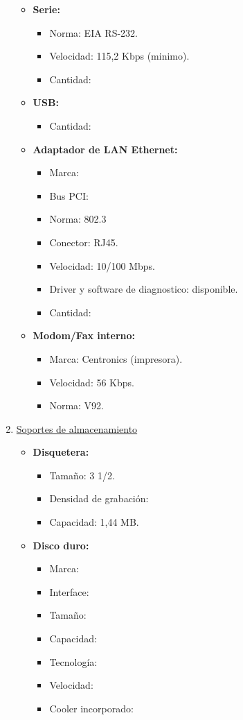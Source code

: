 \begin{enumerate}
\begin{itemize}
    \item \textbf{Serie:}
    \begin{itemize}
      \item Norma: EIA RS-232.
      \item Velocidad: 115,2 Kbps (minimo).
      \item Cantidad:
    \end{itemize}
    
    \item \textbf{USB:}
    \begin{itemize}
      \item Cantidad:
    \end{itemize}
    
    \item \textbf{Adaptador de LAN Ethernet:}
    \begin{itemize}
      \item Marca:
      \item Bus PCI:
      \item Norma: 802.3
      \item Conector: RJ45.
      \item Velocidad: 10/100 Mbps.
      \item Driver y software de diagnostico: disponible.
      \item Cantidad:
    \end{itemize}
       
    \item \textbf{Modom/Fax interno:}
    \begin{itemize}
      \item Marca: Centronics (impresora).
      \item Velocidad: 56 Kbps.
      \item Norma: V92.
    \end{itemize}
  \end{itemize}
    
  \item \underline{Soportes de almacenamiento}
  \begin{itemize}
    \item \textbf{Disquetera:}
    \begin{itemize}
      \item Tamaño: 3 1/2.
      \item Densidad de grabación:
      \item Capacidad: 1,44 MB.
    \end{itemize}
    
    \item \textbf{Disco duro:}
    \begin{itemize}
      \item Marca:
      \item Interface:
      \item Tamaño:
      \item Capacidad:
      \item Tecnología:
      \item Velocidad:
      \item Cooler incorporado:
    \end{itemize}
    

\end{itemize}
\end{enumerate}
